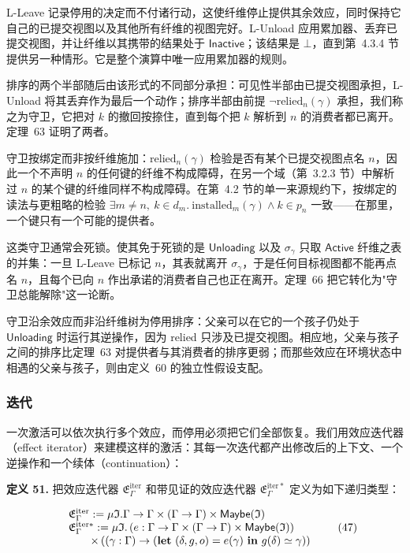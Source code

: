 \documentclass[
  10
]{article}
\begin{document}
L-Leave 记录停用的决定而不付诸行动，这使纤维停止提供其余效应，同时保持它自己的已提交视图以及其他所有纤维的视图完好。L-Unload 应用累加器、丢弃已提交视图，并让纤维以其携带的结果处于 \(\mathsf { I n a c t i v e }\)；该结果是 \(\bot\)，直到第~4.3.4 节提供另一种情形。它是整个演算中唯一应用累加器的规则。

排序的两个半部随后由该形式的不同部分承担：可见性半部由已提交视图承担，L-Unload 将其丢弃作为最后一个动作；排序半部由前提 \(\neg \mathrm { r e l i e d } _ { n } ( \gamma )\) 承担，我们称之为守卫，它把对 \(k\) 的撤回按捺住，直到每个把 \(k\) 解析到 \(n\) 的消费者都已离开。定理~63 证明了两者。

守卫按绑定而非按纤维施加：\(\mathrm { r e l i e d } _ { n } ( \gamma )\) 检验是否有某个已提交视图点名 \(n\)，因此一个不声明 \(n\) 的任何键的纤维不构成障碍，在另一个域（第~3.2.3 节）中解析过 \(n\) 的某个键的纤维同样不构成障碍。在第~4.2 节的单一来源规约下，按绑定的读法与更粗略的检验 \(\exists m \neq n ,\ k \in d _ { m } .\ \mathrm { i n s t a l l e d } _ { m } ( \gamma ) \wedge k \in p _ { n }\) 一致——在那里，一个键只有一个可能的提供者。

这类守卫通常会死锁。使其免于死锁的是 \(\mathsf { U n l o a d i n g }\) 以及 \(\sigma _ { \gamma }\) 只取 \(\mathsf { A c t i v e }\) 纤维之表的并集：一旦 L-Leave 已标记 \(n\)，其表就离开 \(\sigma _ { \gamma }\)，于是任何目标视图都不能再点名 \(n\)，且每个已向 \(n\) 作出承诺的消费者自己也正在离开。定理~66 把它转化为"守卫总能解除"这一论断。

守卫沿余效应而非沿纤维树为停用排序：父亲可以在它的一个孩子仍处于 \(\mathsf { U n l o a d i n g }\) 时运行其逆操作，因为 relied 只涉及已提交视图。相应地，父亲与孩子之间的排序比定理~63 对提供者与其消费者的排序更弱；而那些效应在环境状态中相遇的父亲与孩子，则由定义~60 的独立性假设支配。

\subsubsection{迭代} \label{iteration}

一次激活可以依次执行多个效应，而停用必须把它们全部恢复。我们用效应迭代器（effect iterator）来建模这样的激活：其每一次迭代都产出修改后的上下文、一个逆操作和一个续体（continuation）：

\textbf{定义 51.} 把效应迭代器 \(\mathfrak { E } _ { \Gamma } ^ { \mathrm { i t e r } }\) 和带见证的效应迭代器 \(\mathfrak { E } _ { \Gamma } ^ { \mathrm { i t e r * } }\) 定义为如下递归类型：

\[
\begin{array} { r l } & { \mathfrak { E } _ { \Gamma } ^ { \mathrm { i t e r } } : = \mu \mathfrak { I } . \Gamma \to \Gamma \times ( \Gamma \to \Gamma ) \times \mathsf { M a y b e } ( \mathfrak { I } ) } \\ & { \mathfrak { E } _ { \Gamma } ^ { \mathrm { i t e r * } } : = \mu \mathfrak { I } . \left( e : \Gamma \to \Gamma \times ( \Gamma \to \Gamma ) \times \mathsf { M a y b e } ( \mathfrak { I } ) \right) } \\ & { \qquad \times \left( ( \gamma : \Gamma ) \to ( \mathbf { l e t } \ ( \delta , g , o ) = e ( \gamma ) \ \mathbf { i n } \ g ( \delta ) \simeq \gamma ) \right) } \end{array}\tag{47}
\]
\end{document}
